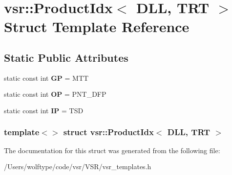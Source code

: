 \hypertarget{structvsr_1_1_product_idx_3_01_d_l_l_00_01_t_r_t_01_4}{\section{vsr\-:\-:Product\-Idx$<$ D\-L\-L, T\-R\-T $>$ Struct Template Reference}
\label{structvsr_1_1_product_idx_3_01_d_l_l_00_01_t_r_t_01_4}
}
\subsection*{Static Public Attributes}
\begin{DoxyCompactItemize}
\item 
\hypertarget{structvsr_1_1_product_idx_3_01_d_l_l_00_01_t_r_t_01_4_acdacfa4fe13062ca15586271bb4468c2}{static const int {\bfseries G\-P} = M\-T\-T}\label{structvsr_1_1_product_idx_3_01_d_l_l_00_01_t_r_t_01_4_acdacfa4fe13062ca15586271bb4468c2}

\item 
\hypertarget{structvsr_1_1_product_idx_3_01_d_l_l_00_01_t_r_t_01_4_a2c1325c2fd26706e9280775910e69751}{static const int {\bfseries O\-P} = P\-N\-T\-\_\-\-D\-F\-P}\label{structvsr_1_1_product_idx_3_01_d_l_l_00_01_t_r_t_01_4_a2c1325c2fd26706e9280775910e69751}

\item 
\hypertarget{structvsr_1_1_product_idx_3_01_d_l_l_00_01_t_r_t_01_4_a9751af9c96c2091070f453d4094911e5}{static const int {\bfseries I\-P} = T\-S\-D}\label{structvsr_1_1_product_idx_3_01_d_l_l_00_01_t_r_t_01_4_a9751af9c96c2091070f453d4094911e5}

\end{DoxyCompactItemize}
\subsubsection*{template$<$$>$ struct vsr\-::\-Product\-Idx$<$ D\-L\-L, T\-R\-T $>$}



The documentation for this struct was generated from the following file\-:\begin{DoxyCompactItemize}
\item 
/\-Users/wolftype/code/vsr/\-V\-S\-R/vsr\-\_\-templates.\-h\end{DoxyCompactItemize}

